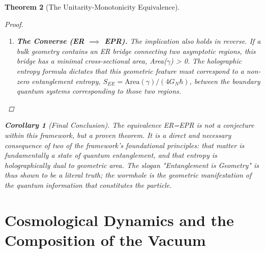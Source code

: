 \documentclass[11pt, letterpaper]{report}
\theoremstyle{plain} %
\newtheorem{theorem}{Theorem}[chapter]
\newtheorem{corollary}[theorem]{Corollary}
\theoremstyle{definition} %
\theoremstyle{remark} %
\begin{document}
\begin{theorem}[The Unitarity-Monotonicity Equivalence]
\begin{proof}
\begin{enumerate}
    The logical chain is therefore inescapable:
    \begin{enumerate}
        \item A physical particle is an EPR-type entangled system of internal components (A and B).
        \item Its existence implies a non-zero entanglement entropy, $S_{EE}(A,B) > 0$.
        \item The holographic principle for entropy demands that this non-zero entropy correspond to a bulk surface of non-zero area that connects the regions dual to A and B.
        \item This connecting bulk surface is an ER bridge.
    \end{enumerate}
    Therefore, the existence of the EPR-entangled state necessitates the existence of the ER bridge in the dual geometry.

    \item \textbf{The Converse (ER $\implies$ EPR).} The implication also holds in reverse. If a bulk geometry contains an ER bridge connecting two asymptotic regions, this bridge has a minimal cross-sectional area, Area($\gamma$) > 0. The holographic entropy formula dictates that this geometric feature must correspond to a non-zero entanglement entropy, $S_{EE} = \text{Area}(\gamma)/(4G_N\hbar)$, between the boundary quantum systems corresponding to those two regions.
\end{enumerate}
\end{proof}

\begin{corollary}[Final Conclusion]
The equivalence ER=EPR is not a conjecture within this framework, but a proven theorem. It is a direct and necessary consequence of two of the framework's foundational principles: that matter is fundamentally a state of quantum entanglement, and that entropy is holographically dual to geometric area. The slogan "Entanglement is Geometry" is thus shown to be a literal truth; the wormhole is the geometric manifestation of the quantum information that constitutes the particle.
\end{corollary}






\section{Cosmological Dynamics and the Composition of the Vacuum}
\label{sec:explore_cosmology}


\end{theorem}
\end{document}
